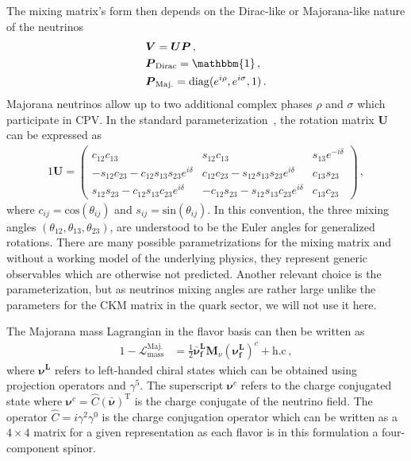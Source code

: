 \documentclass[a4paper]{article}
\newcommand*{\bb}{\boldsymbol}
\begin{document}
The mixing matrix's form then depends on the Dirac-like or Majorana-like nature of the neutrinos
\begin{alignat}{1}
	\label{phases:1} &\bb{V} = \bb{U}\bb{P}\,,\\
	\label{phases:2} &\bb{P}_\mathrm{Dirac} = \mathbbm{1}\,,\\
	\label{phases:3} &\bb{P}_\mathrm{Maj.} = \mathrm{diag}(e^{i\rho},e^{i\sigma},1)\,.
\end{alignat}
Majorana neutrinos allow up to two additional complex phases $\rho$ and $\sigma$ which participate in CPV. In the standard parameterization~\citep{Schwartz:2014sze}, the rotation matrix $\bb{U}$ can be expressed as
\begin{alignat}{1}
	\label{rotation:1} \bb{U} =
	  \begin{pmatrix}
		  c_{12}c_{13} & s_{12}c_{13} & s_{13}e^{-i\delta}\\
		  -s_{12}c_{23} - c_{12}s_{13}s_{23}e^{i\delta} & c_{12}c_{23} - s_{12}s_{13}s_{23}e^{i\delta} & c_{13}s_{23}\\
		  s_{12}s_{23} - c_{12}s_{13}c_{23}e^{i\delta}& -c_{12}s_{23} - s_{12}s_{13}c_{23}e^{i\delta} & c_{13}c_{23}
	  \end{pmatrix}\,,
\end{alignat}
where $c_{ij} = \mathrm{cos}(\theta_{ij})$ and $s_{ij} = \mathrm{sin}(\theta_{ij})$. In this convention, the three mixing angles $(\theta_{12}, \theta_{13}, \theta_{23})$, are understood to be the Euler angles for generalized rotations. There are many possible parametrizations for the mixing matrix and without a working model of the underlying physics, they represent generic observables which are otherwise not predicted. Another relevant choice is the~\cite{wolfenstein1983parametrization} parameterization, but as neutrinos mixing angles are rather large unlike the parameters for the CKM matrix in the quark sector, we will not use it here.

The Majorana mass Lagrangian in the flavor basis can then be written as
\begin{alignat}{1}
	\label{mass:1} -\mathcal{L}_{\mathrm{mass}}^{\mathrm{Maj.}}&=\frac{1}{2}\bb{\bar{\nu}_{f}^{L}}\bb{M}_{\nu}\left(\bb{\nu_{f}^{L}}\right)^{c}+\mathrm{h.c}\,,
\end{alignat}
where $\bb{\nu^{L}}$ refers to left-handed chiral states which can be obtained using projection operators and $\gamma^{5}$. The superscript $\bb{\nu}^{c}$ refers to the charge conjugated state where $\bb{\nu}^{c} = \hat{C}(\bb{\bar{\nu}})^\mathrm{T}$ is the charge conjugate of the neutrino field. The operator $\hat{C} = i\gamma^{2}\gamma^{0}$ is the charge conjugation operator which can be written as a $4\times4$ matrix for a given representation as each flavor is in this formulation a four-component spinor.
\end{document}
